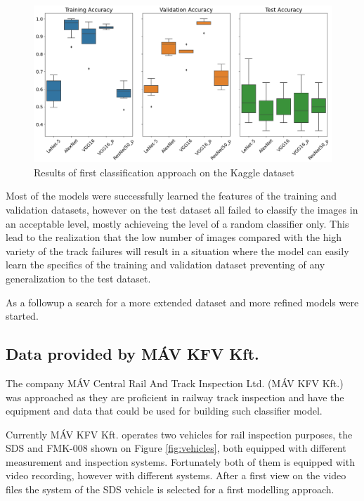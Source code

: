 \begin{figure}[!ht]
    \centering
    \includegraphics[width=\textwidth]{./tex_images/bootstrap_results.png}
    \caption{Results of first classification approach on the Kaggle dataset}
    \label{fig:Kaggle_results}
\end{figure}

Most of the models were successfully learned the features of the training and validation datasets,
however on the test dataset all failed to classify the images in an acceptable level, mostly
achieveing the level of a random classifier only.
This lead to the realization that the low number of images compared with the high variety of the track
failures will result in a situation where the model can easily learn the specifics of the training and
validation dataset preventing of any generalization to the test dataset.

As a followup a search for a more extended dataset and more refined models were started.

\subsection{Data provided by MÁV KFV Kft.}
The company MÁV Central Rail And Track Inspection Ltd. (MÁV KFV Kft.) \cite{_mav_} was approached
as they are proficient in railway track inspection and have the equipment and data that could be used
for building such classifier model.

Currently MÁV KFV Kft. operates two vehicles for rail inspection purposes, the SDS and FMK-008 shown on
Figure \ref{fig:vehicles}, both equipped with different measurement and inspection systems.
Fortunately both of them is equipped with video recording, however with different systems.
After a first view on the video files the system of the SDS vehicle is selected for a first modelling
approach.

